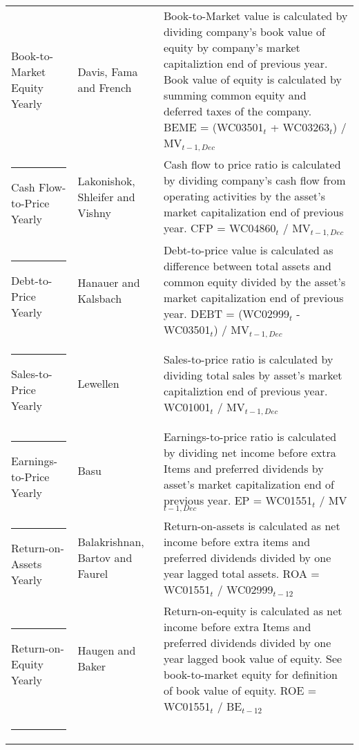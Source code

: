 \documentclass{article}
\begin{document}
{{\begin{xltabular}{\textwidth}{ >{\raggedright\arraybackslash}p{0.23\textwidth} >{\raggedright\arraybackslash}p{0.2\textwidth} X}
Book-to-Market Equity \newline Yearly & Davis, Fama and French \citeyear{Davis2000}	&  Book-to-Market value is calculated by dividing company's book value of equity by company's market capitaliztion end of previous year. Book value of equity is calculated by summing common equity and deferred taxes of the company. \newline BEME = (WC03501$_{t}$ + WC03263$_{t}$) /  MV$_{t-1, Dec}$\\ \rule{-1ex}{3ex}
Cash Flow-to-Price \newline Yearly	& Lakonishok, Shleifer and Vishny  \citeyear{Lakonishok1994} 	& Cash flow to price ratio is calculated by dividing company's cash flow from operating activities by the asset's market capitalization end of previous year. \newline CFP = WC04860$_{t}$ / MV$_{t-1, Dec}$\\ \rule{-1ex}{3ex}
Debt-to-Price \newline Yearly		& Hanauer and Kalsbach \citeyear{HANAUER2023}	& Debt-to-price value is calculated as difference between total assets and common equity divided by the asset's market capitalization end of previous year. \newline DEBT = (WC02999$_{t}$ - WC03501$_{t}$) / MV$_{t-1, Dec}$\\ \rule{-1ex}{3ex}
Sales-to-Price 	\newline Yearly		& Lewellen \citeyear{Lewellen2015}				& Sales-to-price ratio is calculated by dividing total sales by asset's market capitaliztion end of previous year. \newline WC01001$_{t}$ / MV$_{t-1, Dec}$ \\ \rule{-1ex}{3ex}
Earnings-to-Price \newline Yearly	& Basu \citeyear{Basu1977}					& Earnings-to-price ratio is calculated by dividing net income before extra Items and preferred dividends by asset's market capitalization end of previous year. \newline EP = WC01551$_{t}$ / MV$_{t-1, Dec}$ \\ \rule{-1ex}{3ex}
Return-on-Assets \newline Yearly	& Balakrishnan, Bartov and Faurel \citeyear{BALAKRISHNAN2010}	& Return-on-assets is calculated as net income before extra items and preferred dividends divided by one year lagged total assets. \newline ROA = WC01551$_{t}$ / WC02999$_{t-12}$ \\ \rule{-1ex}{3ex}
Return-on-Equity \newline Yearly	& Haugen and Baker \citeyear{HAUGEN1996}		& Return-on-equity is calculated as net income before extra Items and preferred dividends divided by one year lagged book value of equity. See book-to-market equity for definition of book value of equity. \newline ROE = WC01551$_{t}$ / BE$_{t-12}$ \\ \rule{-1ex}{3ex}

\end{xltabular}}}
\end{document}
